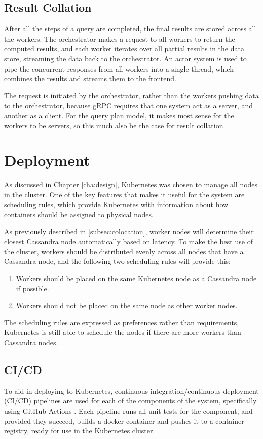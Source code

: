 \subsection{Result Collation}
After all the steps of a query are completed, the final results are stored across all the workers. The orchestrator makes a request to all workers to return the computed results, and each worker iterates over all partial results in the data store, streaming the data back to the orchestrator. An actor system is used to pipe the concurrent responses from all workers into a single thread, which combines the results and streams them to the frontend. 

The request is initiated by the orchestrator, rather than the workers pushing data to the orchestrator, because gRPC requires that one system act as a server, and another as a client. For the query plan model, it makes most sense for the workers to be servers, so this much also be the case for result collation.

\section{Deployment}
As discussed in Chapter \ref{cha:design}, Kubernetes was chosen to manage all nodes in the cluster. One of the key features that makes it useful for the system are scheduling rules, which provide Kubernetes with information about how containers should be assigned to physical nodes.

As previously described in \ref{subsec:colocation}, worker nodes will determine their closest Cassandra node automatically based on latency. To make the best use of the cluster, workers should be distributed evenly across all nodes that have a Cassandra node, and the following two scheduling rules will provide this:
\begin{enumerate}
	\item Workers should be placed on the same Kubernetes node as a Cassandra node if possible.
	\item Workers should not be placed on the same node as other worker nodes.
\end{enumerate}

The scheduling rules are expressed as preferences rather than requirements, Kubernetes is still able to schedule the nodes if there are more workers than Cassandra nodes.

\subsection{CI/CD}
To aid in deploying to Kubernetes, continuous integration/continuous deployment (CI/CD) pipelines are used for each of the components of the system, specifically using GitHub Actions \cite{githubactions}. Each pipeline runs all unit tests for the component, and provided they succeed, builds a docker container and pushes it to a container registry, ready for use in the Kubernetes cluster.

